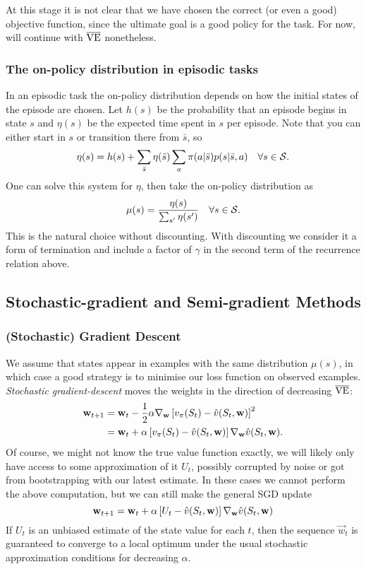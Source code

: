 At this stage it is not clear that we have chosen the correct (or even a good) objective function, since the ultimate goal is a good policy for the task. For now, will continue with $\VE{}$ nonetheless.

\subsubsection*{The on-policy distribution in episodic tasks}
In an episodic task the on-policy distribution depends on how the initial states of the episode are chosen. Let $h(s)$ be the probability that an episode begins in state $s$ and $\eta(s)$ be the expected time spent in $s$ per episode. Note that you can either start in $s$ or transition there from $\bar{s}$, so
\[
    \eta(s) = h(s) + \sum_{\bar{s}} \eta(\bar{s}) \sum_a \pi(a \vert{} \bar{s}) p(s \vert{} \bar{s}, a) \quad \forall s \in \S{}.
\]
One can solve this system for $\eta$, then take the on-policy distribution as 
\[
    \mu(s) = \frac{\eta(s)}{\sum_{s'}\eta(s')} \quad \forall s \in \S{}.
\]
This is the natural choice without discounting. With discounting we consider it a form of termination and include a factor of $\gamma$ in the second term of the recurrence relation above.

\subsection{Stochastic-gradient and Semi-gradient Methods}
\subsubsection*{(Stochastic) Gradient Descent}
We assume that states appear in examples with the same distribution $\mu(s)$, in which case a good strategy is to minimise our loss function on observed examples. \emph{Stochastic gradient-descent} moves the weights in the direction of decreasing $\VE{}$:
\begin{align}
    \vec{w}_{t+1} &=  \vec{w}_t - \frac12 \alpha \grad_{\vec{w}} \left[v_\pi(S_t) - \hat{v}(S_t, \vec{w})\right]^2 \\
                  &= \vec{w}_t + \alpha \left[ v_\pi(S_t) - \hat{v}(S_t, \vec{w})\right] \grad_{\vec{w}} \hat{v}(S_t, \vec{w}).
\end{align}
Of course, we might not know the true value function exactly, we will likely only have access to some approximation of it $U_t$, possibly corrupted by noise or got from bootstrapping with our latest estimate. In these cases we cannot perform the above computation, but we can still make the general SGD update
\begin{equation}
    \vec{w}_{t+1} = \vec{w}_t + \alpha \left[ U_t - \hat{v}(S_t, \vec{w})\right] \grad_{\vec{w}} \hat{v}(S_t, \vec{w})
\end{equation}
If $U_t$ is an unbiased estimate of the state value for each $t$, then the sequence $\vec{w}_t$ is guaranteed to converge to a local optimum under the usual stochastic approximation conditions for decreasing $\alpha$.\\

